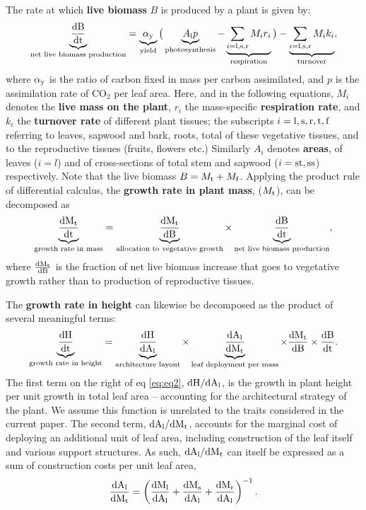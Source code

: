 \documentclass[a4paper,11pt]{article}
\newcommand{\ud}{\ensuremath{\rm{d}}}
\begin{document}
The rate at which \textbf{live biomass} $B$ is produced by a plant is given by:
\begin{equation}\label{eq:eq0}
\underbrace{\frac{\ud B}{\ud t}}_{\text{net live biomass production}} = \underbrace{\alpha_{\rm y}}_{\text{yield}}  \big(\underbrace{A_{\rm l} p}_{\text{photosynthesis}} - \underbrace{\sum_{i = {\rm l,s,r}} M_{i} r_{i}}_{\text{respiration}}\big) - \underbrace{ \sum_{i = \rm{l,s,r}} M_{i} k_{i}}_{\text{turnover}},
\end{equation}
where $\alpha_{\rm y}$ is the ratio of carbon fixed in mass per carbon assimilated, and $p$ is the assimilation rate of CO$_{2}$ per leaf area. Here, and in the following equations, $M_i$ denotes the \textbf{live mass on the plant}, $r_i$ the mass-specific \textbf{respiration rate}, and $k_i$ the \textbf{turnover rate} of different plant tissues; the subscripts $i = \rm{l,s,r,t,f}$ referring to leaves, sapwood and bark, roots, total of these vegetative tissues, and to the reproductive tissues (fruits, flowers etc.)  Similarly $A_i$ denotes \textbf{areas}, of leaves ($i = l$) and of cross-sections of total stem and sapwood ($i =\rm{st,ss}$) respectively. Note that the live biomass $B = M_{\rm t} + M_{\rm f}$.  Applying the product rule of differential calculus, the \textbf{growth rate in plant mass}, ($M_{\rm t}$), can be decomposed as
\begin{equation}\label{eq:eq1}
\underbrace{{\frac{\ud M_{\rm t}}{\ud t}}}_{\text{growth rate in mass}} = \underbrace{\frac{\ud M_{\rm t}}{\ud B}}_{\text{allocation to vegetative growth}}  \times \underbrace{\frac{\ud B}{\ud t}}_{\text{net live biomass production}},
\end{equation}
where $\frac{\ud M_{\rm t}}{\ud B}$ is the fraction of net live biomass increase that goes to vegetative growth rather than to production of reproductive tissues.

The \textbf{growth rate in height} can likewise be decomposed as the product of several meaningful terms:
\begin{equation}\label{eq:eq2}
\underbrace{\frac{\ud H}{\ud t}}_{\text{growth rate in height}} = \underbrace{\frac{\ud H}{\ud A_{\rm l}}}_{\text{architecture layout}} \times \underbrace{{\frac{\ud A_{\rm l}}{\ud M_{\rm t}}}}_{\text{leaf deployment per mass}} \times {\frac{\ud M_{\rm t}}{\ud B}} \times {\frac{\ud B}{\ud t}}.
\end{equation}
The first term on the right of eq \ref{eq:eq2},
$\ud H / \ud A_{\rm l}$, is the growth in plant height
per unit growth in total leaf area -- accounting for the architectural
strategy of the plant. We assume this function is unrelated to the traits considered in the current paper. The second term, $\ud A_{\rm l} / \ud M_{\rm t}$,
accounts for the marginal cost of deploying an additional unit of leaf
area, including construction of the leaf itself and various support
structures. As such, $\ud A_{\rm l} / \ud M_{\rm t}$
can itself be expressed as a sum of construction costs per unit leaf
area,
\begin{equation}\label{eq:daldmt}
\frac{\ud A_{\rm l}}{\ud M_{\rm t}}
= \left(\frac{\ud M_{\rm l}}{\ud A_{\rm l}}
 +  \frac{\ud M_{\rm s}}{\ud A_{\rm l}} + \frac{\ud M_{\rm r}}{\ud A_{\rm l}}\right)^{-1}.
\end{equation}
\end{document}
